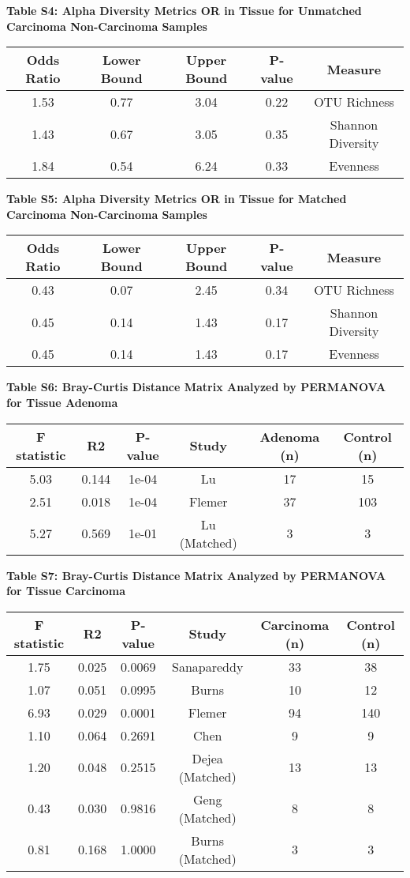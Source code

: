 \documentclass[12pt,]{article}
\begin{document}
\newpage

\textbf{Table S4: Alpha Diversity Metrics OR in Tissue for Unmatched
Carcinoma Non-Carcinoma Samples}

\begin{longtable}[]{@{}ccccc@{}}
\toprule
Odds Ratio & Lower Bound & Upper Bound & P-value &
Measure\tabularnewline
\midrule
\endhead
1.53 & 0.77 & 3.04 & 0.22 & OTU Richness\tabularnewline
1.43 & 0.67 & 3.05 & 0.35 & Shannon Diversity\tabularnewline
1.84 & 0.54 & 6.24 & 0.33 & Evenness\tabularnewline
\bottomrule
\end{longtable}

\newpage

\textbf{Table S5: Alpha Diversity Metrics OR in Tissue for Matched
Carcinoma Non-Carcinoma Samples}

\begin{longtable}[]{@{}ccccc@{}}
\toprule
Odds Ratio & Lower Bound & Upper Bound & P-value &
Measure\tabularnewline
\midrule
\endhead
0.43 & 0.07 & 2.45 & 0.34 & OTU Richness\tabularnewline
0.45 & 0.14 & 1.43 & 0.17 & Shannon Diversity\tabularnewline
0.45 & 0.14 & 1.43 & 0.17 & Evenness\tabularnewline
\bottomrule
\end{longtable}

\newpage

\textbf{Table S6: Bray-Curtis Distance Matrix Analyzed by PERMANOVA for
Tissue Adenoma}

\begin{longtable}[]{@{}cccccc@{}}
\toprule
F statistic & R2 & P-value & Study & Adenoma (n) & Control
(n)\tabularnewline
\midrule
\endhead
5.03 & 0.144 & 1e-04 & Lu & 17 & 15\tabularnewline
2.51 & 0.018 & 1e-04 & Flemer & 37 & 103\tabularnewline
5.27 & 0.569 & 1e-01 & Lu (Matched) & 3 & 3\tabularnewline
\bottomrule
\end{longtable}

\newpage

\textbf{Table S7: Bray-Curtis Distance Matrix Analyzed by PERMANOVA for
Tissue Carcinoma}

\begin{longtable}[]{@{}cccccc@{}}
\toprule
F statistic & R2 & P-value & Study & Carcinoma (n) & Control
(n)\tabularnewline
\midrule
\endhead
1.75 & 0.025 & 0.0069 & Sanapareddy & 33 & 38\tabularnewline
1.07 & 0.051 & 0.0995 & Burns & 10 & 12\tabularnewline
6.93 & 0.029 & 0.0001 & Flemer & 94 & 140\tabularnewline
1.10 & 0.064 & 0.2691 & Chen & 9 & 9\tabularnewline
1.20 & 0.048 & 0.2515 & Dejea (Matched) & 13 & 13\tabularnewline
0.43 & 0.030 & 0.9816 & Geng (Matched) & 8 & 8\tabularnewline
0.81 & 0.168 & 1.0000 & Burns (Matched) & 3 & 3\tabularnewline
\bottomrule
\end{longtable}
\end{document}
